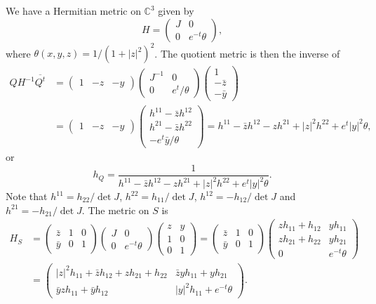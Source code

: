 \documentclass[10pt,a4paper]{amsart}
\newcommand{\kk}[1]{\mathbb{#1}}
\def\ov#1{\overline{#1}}
\begin{document}
We have a Hermitian metric on $\kk C^3$ given by
$$
H = \begin{pmatrix}
	J & 0
	\\
	0 & e^{-t} \theta
\end{pmatrix},
$$
where $\theta(x,y,z) = 1 / (1+|z|^2)^2$.
The quotient metric is then the inverse of
\begin{align*}
Q H^{-1} \ov{Q^t}
&= \begin{pmatrix} 1 & -z & -y \end{pmatrix}
\begin{pmatrix}
J^{-1} & 0
\\
0 & e^t/\theta
\end{pmatrix}
\begin{pmatrix} 1 \\ -\bar z \\ -\bar y \end{pmatrix}
\\
&= \begin{pmatrix} 1 & -z & -y \end{pmatrix}
\begin{pmatrix}
h^{11} - \bar z h^{12}
\\
h^{21} - \bar z h^{22}
\\
-e^t \bar y/\theta
\end{pmatrix}
= h^{11} - \bar z h^{12} - z h^{21} + |z|^2 h^{22} + e^t |y|^2 \theta,
\end{align*}
or
$$
h_Q
= \frac{1}{h^{11} - \bar z h^{12} - z h^{21} + |z|^2 h^{22} + e^t |y|^2 \theta}.
$$
Note that $h^{11} = h_{22} / \det J$, $h^{22} = h_{11} / \det J$,
$h^{12} = -h_{12} / \det J$ and $h^{21} = -h_{21} / \det J$.
The metric on $S$ is
\begin{align*}
H_S
&=
\begin{pmatrix}
\bar z & 1 & 0
\\
\bar y & 0 & 1
\end{pmatrix}
\begin{pmatrix}
J & 0
\\
0 & e^{-t}\theta
\end{pmatrix}
\begin{pmatrix}
z & y
\\
1 & 0
\\
0 & 1
\end{pmatrix}
=
\begin{pmatrix}
\bar z & 1 & 0
\\
\bar y & 0 & 1
\end{pmatrix}
\begin{pmatrix}
z h_{11} + h_{12} & y h_{11}
\\
z h_{21} + h_{22} & y h_{21}
\\
0 & e^{-t} \theta
\end{pmatrix}
\\
&=
\begin{pmatrix}
|z|^2 h_{11} + \bar z h_{12} + z h_{21} + h_{22} &
\bar z y h_{11} + y h_{21}
\\
\bar y z h_{11} + \bar y h_{12} &
|y|^2 h_{11} + e^{-t} \theta
\end{pmatrix}.
\end{align*}
\end{document}

